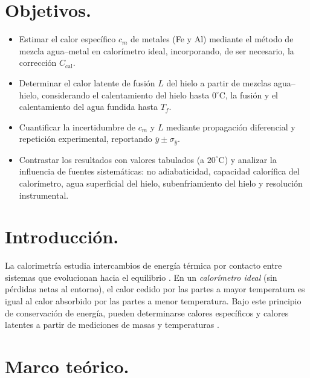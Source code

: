 \documentclass[11pt,twocolumn]{article}
\makeatletter
\let\orig@cite\cite
\renewcommand{\cite}[1]{\textcolor{Blue}{\orig@cite{#1}}}
\let\orig@parencite\parencite
\renewcommand{\parencite}[1]{\textcolor{Blue}{\orig@parencite{#1}}}
\renewcommand{\cite}[1]{\parencite{#1}}      %
\let\orig@cite\cite
\renewcommand{\cite}[1]{\textcolor{Blue}{\orig@cite{#1}}} %
\makeatother
\begin{document}
\section{Objetivos.}
\begin{itemize}
    \item Estimar el calor específico \(c_m\) de metales (Fe y Al) mediante el método de mezcla agua–metal en calorímetro ideal, incorporando, de ser necesario, la corrección \(C_{\text{cal}}\).
    \item Determinar el calor latente de fusión \(L\) del hielo a partir de mezclas agua–hielo, considerando el calentamiento del hielo hasta \(0^{\circ}\mathrm{C}\), la fusión y el calentamiento del agua fundida hasta \(T_f\).
    \item Cuantificar la incertidumbre de \(c_m\) y \(L\) mediante propagación diferencial y repetición experimental, reportando \(\overline{y}\pm\sigma_{\overline{y}}\).
    \item Contrastar los resultados con valores tabulados (a \(20^{\circ}\mathrm{C}\)) y analizar la influencia de fuentes sistemáticas: no adiabaticidad, capacidad calorífica del calorímetro, agua superficial del hielo, subenfriamiento del hielo y resolución instrumental.
\end{itemize}


\section{Introducción.}
La calorimetría estudia intercambios de energía térmica por contacto entre sistemas que evolucionan
hacia el equilibrio \cite{serway,tipler,halliday}. En un \emph{calorímetro ideal} (sin pérdidas netas al entorno),
el calor cedido por las partes a mayor temperatura es igual al calor absorbido por las partes a menor
temperatura. Bajo este principio de conservación de energía, pueden determinarse calores específicos y
calores latentes a partir de mediciones de masas y temperaturas \cite{serway,tipler}.

\section{Marco teórico.}
\end{document}
